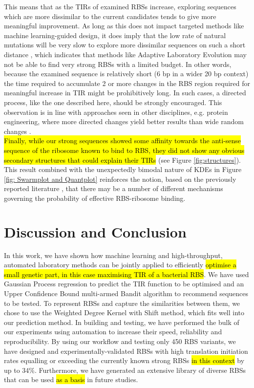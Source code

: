 \documentclass{article}
\begin{document}
This means that as the TIRs of examined RBSs increase, exploring sequences which are more dissimilar to the current candidates tends to give more meaningful improvement. 
As long as this does not impact targeted methods like machine learning-guided design, it does imply that the low rate of natural mutations will be very slow to explore more dissimilar sequences on such a short distance \cite{Lee2012}, which indicates that methods like Adaptive Laboratory Evolution may not be able to find very strong RBSs with a limited budget.  
In other words, because the examined sequence is relatively short (6 bp in a wider 20 bp context) the time required to accumulate 2 or more changes in the RBS region required for meaningful increase in TIR might be prohibitively long.
In such cases, a directed process, like the one described here, should be strongly encouraged.
This observation is in line with approaches seen in other disciplines, e.g. protein engineering, where more directed changes yield better results than wide random changes \cite{Jackel2008}.\\

\hl{Finally, while our strong sequences showed some affinity towards the anti-sense sequence of the ribosome known to bind to RBS, they did not show any obvious secondary structures that could explain their TIRs} (see Figure \ref{fig:structures}).
This result combined with the unexpectedly bimodal nature of KDEs in Figure \ref{fig: Swarmplot and Quantplot} reinforces the notion, based on the previously reported literature \cite{Saito2020,EspahBorujeni2016}, that there may be a number of different mechanisms governing the probability of effective RBS-ribosome binding.\\



\section{Discussion and Conclusion}

In this work, we have shown how machine learning and high-throughput, automated laboratory methods can be jointly applied to efficiently \hl{optimise a small genetic part, in this case maximising TIR of a bacterial RBS}. 
We have used Gaussian Process regression to predict the TIR function to be optimised and an Upper Confidence Bound multi-armed Bandit algorithm to recommend sequences to be tested.
To represent RBSs and capture the similarities between them, we chose to use the Weighted Degree Kernel with Shift method, which fits well into our prediction method.
In building and testing, we have performed the bulk of our experiments using automation to increase their speed, reliability and reproducibility.
By using our workflow and testing only 450 RBS variants, we have designed and experimentally-validated RBSs with high translation initiation rates equalling or exceeding the currently known strong RBSs \hl{in this context} by up to 34\%.
Furthermore, we have generated an extensive library of diverse RBSs that can be used \hl{as a basis} in future studies.\\
\end{document}
